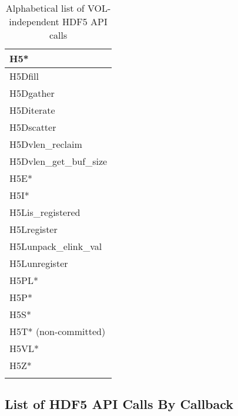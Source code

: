\begin{longtable}{ |>{\raggedright\arraybackslash}p{\linewidth}| }
    \hline
    H5* \\
    \hline
    H5Dfill \\
    H5Dgather \\
    H5Diterate \\
    H5Dscatter \\
    H5Dvlen\_reclaim \\
    H5Dvlen\_get\_buf\_size \\
    \hline
    H5E* \\
    H5I* \\
    \hline
    H5Lis\_registered \\
    H5Lregister \\
    H5Lunpack\_elink\_val \\
    H5Lunregister \\
    \hline
    H5PL* \\
    H5P* \\
    H5S* \\
    H5T* (non-committed) \\
    H5VL* \\
    H5Z* \\
    \hline
\caption{Alphabetical list of VOL-independent HDF5 API calls}
\end{longtable}

\subsection{List of HDF5 API Calls By Callback}

